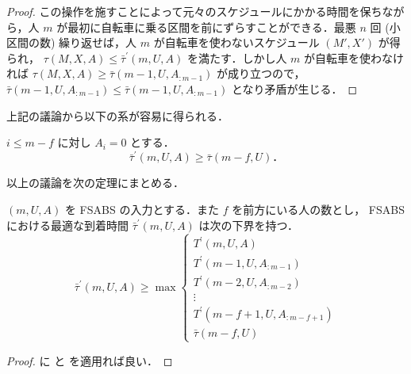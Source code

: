 \begin{proof}
この操作を施すことによって元々のスケジュールにかかる時間を保ちながら，人 $m$ が最初に自転車に乗る区間を前にずらすことができる．最悪 $n$ 回 (小区間の数) 繰り返せば，人 $m$ が自転車を使わないスケジュール $(M\prime, X\prime)$ が得られ， $\tau(M, X, A) \leq \bar\tau^{\prime}(m, U, A)$ を満たす．しかし人 $m$ が自転車を使わなければ $\tau(M, X, A) \geq \bar\tau(m - 1, U, A_{:m-1})$ が成り立つので， $\bar\tau(m - 1, U, A_{:m-1}) \leq \bar\tau(m - 1, U,A_{:m-1})$ となり矛盾が生じる．
\end{proof}
上記の議論から以下の系が容易に得られる．
\begin{corollary}\label{corollary:fsabs-lower-bound-bs}
  $i \leq m - f$ に対し $A_i = 0$ とする．
  \begin{equation}
    \bar\tau^{\prime}(m, U, A) \geq \bar\tau(m - f, U)．
  \end{equation}
\end{corollary}

以上の議論を次の定理にまとめる．
\begin{theorem}\label{theorem:fsabs-lower-bound}
  $(m, U, A)$ を FSABS の入力とする．また $f$ を前方にいる人の数とし， FSABS における最適な到着時間 $\bar\tau^\prime(m, U, A)$ は次の下界を持つ．
  \begin{equation}
    \bar\tau^\prime(m, U, A) \geq \max \begin{cases}
      T^\prime(m, U, A) \\
      T^\prime(m - 1, U, A_{:m-1}) \\
      T^\prime(m - 2, U, A_{:m-2}) \\
      \vdots \\
      T^\prime(m - f + 1, U, A_{:m-f+1}) \\
      \bar\tau(m - f, U)
    \end{cases}
  \end{equation}
\end{theorem}
\begin{proof}
   に  と  を適用れば良い．
\end{proof}